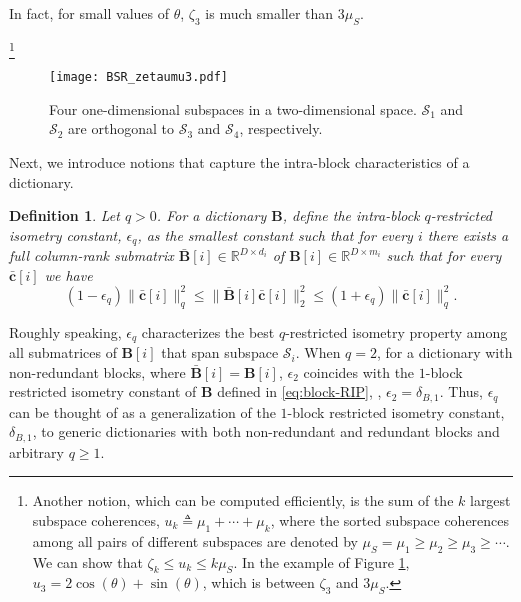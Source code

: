 \documentclass[10pt,twocolumn,twoside] {IEEEtran}
\newtheorem{definition}{Definition}
\begin{document}
In fact, for small values of $\theta$, $\zeta_3$ is much smaller than $3 \mu_S$.{\footnote{Another notion, which can be computed efficiently, is the sum of the $k$ largest subspace coherences, $u_k \triangleq \mu_1 + \cdots + \mu_k$, where the sorted subspace coherences among all pairs of different subspaces are denoted by $\mu_S = \mu_{1} \geq \mu_{2} \geq \mu_{3} \geq \cdots.$ We can show that $\zeta_k \leq u_k \leq k \mu_S$. In the example of Figure \ref{fig:4-subspaces}, $u_3 = 2 \cos(\theta) + \sin(\theta)$, which is between $\zeta_3$ and $3 \mu_S$.}

\begin{figure}
\centering 
\texttt{[image: BSR\_zetaumu3.pdf]}
\vspace{-2mm}
\caption{\footnotesize{Four one-dimensional subspaces in a two-dimensional space. $\mathcal{S}_1$ and $\mathcal{S}_2$ are orthogonal to $\mathcal{S}_3$ and $\mathcal{S}_4$, respectively.}}
\label{fig:4-subspaces}
\end{figure}

Next, we introduce notions that capture the intra-block characteristics of a dictionary.

\vspace{1mm}
\begin{definition}
\label{def:genRIP}
Let $q > 0$. For a dictionary ${\boldsymbol{B}}$, define the \emph{intra-block $q$-restricted isometry constant}, $\epsilon_{q}$, as the smallest constant such that for every $i$ there exists a full column-rank submatrix $\bar{\boldsymbol{B}}[i] \in {\mathbb{R}}^{D \times d_i}$ of ${\boldsymbol{B}}[i] \in {\mathbb{R}}^{D \times m_i}$ such that for every $\bar{\boldsymbol{c}}[i]$ we have
\begin{equation}
\label{eq:delta-i}
( 1 - \epsilon_{q} ) \| \bar{\boldsymbol{c}}[i] \|_q^2 \leq \| \bar{\boldsymbol{B}}[i] \bar{\boldsymbol{c}}[i] \|_2^2 \leq ( 1 + \epsilon_{q} ) \| \bar{\boldsymbol{c}}[i] \|_q^2.
\end{equation}
\end{definition}
\vspace{1mm}
Roughly speaking, $\epsilon_{q}$ characterizes the best $q$-restricted isometry property among all submatrices of ${\boldsymbol{B}}[i]$ that span subspace ${\mathcal{S}}_i$. When $q = 2$, for a dictionary with non-redundant blocks, where $\bar{\boldsymbol{B}}[i] = {\boldsymbol{B}}[i]$, $\epsilon_2$ coincides with the $1$-block restricted isometry constant of ${\boldsymbol{B}}$ defined in \eqref{eq:block-RIP}, {}, $\epsilon_2 = \delta_{B,1}$. Thus, $\epsilon_q$ can be thought of as a generalization of the $1$-block restricted isometry constant, $\delta_{B,1}$, to generic dictionaries with both non-redundant and redundant blocks and arbitrary $q \geq 1$.

}
\end{document}
